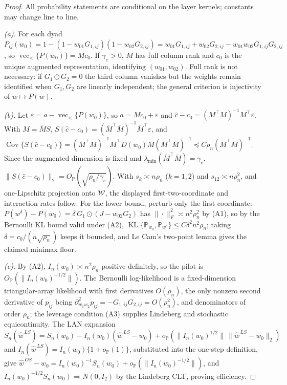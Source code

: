 \documentclass[12pt]{article}
\newcommand{\1}{\mathbf{1}}
\begin{document}
\begin{proof}
All probability statements are conditional on the layer kernels; constants may change line to line.

\emph{(a).} For each dyad $P_{ij}(w_0)=1-(1-w_{01}G_{1,ij})(1-w_{02}G_{2,ij})
=w_{01}G_{1,ij}+w_{02}G_{2,ij}-w_{01}w_{02}G_{1,ij}G_{2,ij}$, so
$\operatorname{vec}_<\{P(w_0)\}=Mc_0$. If $\gamma_e>0$, $M$ has full column rank and $c_0$ is the
unique augmented representation, identifying $(w_{01},w_{02})$. Full rank is not necessary: if
$G_1\odot G_2=0$ the third column vanishes but the weights remain identified when $G_1,G_2$ are
linearly independent; the general criterion is injectivity of $w\mapsto P(w)$.

\emph{(b).} Let $\varepsilon=a-\operatorname{vec}_<\{P(w_0)\}$, so $a=Mc_0+\varepsilon$ and
$\widehat c-c_0=(M^\top M)^{-1}M^\top\varepsilon$. With $M=\bar MS$,
$S(\widehat c-c_0)=(\bar M^\top\bar M)^{-1}\bar M^\top\varepsilon$, and
$\operatorname{Cov}\{S(\widehat c-c_0)\}=(\bar M^\top\bar M)^{-1}\bar M^\top D(w_0)\bar M(\bar M^\top\bar
M)^{-1}\preceq C\rho_n(\bar M^\top\bar M)^{-1}$. Since the augmented dimension is fixed and
$\lambda_{\min}(\bar M^\top\bar M)=\gamma_e$, $\|S(\widehat c-c_0)\|_2=O_{\mathbb P}(\sqrt{\rho_n/
\gamma_e})$. With $s_k\asymp n\rho_n$ ($k=1,2$) and $s_{12}\asymp n\rho_n^2$, and one-Lipschitz
projection onto $\mathcal W$, the displayed first-two-coordinate and interaction rates follow. For the
lower bound, perturb only the first coordinate: $P(w^\delta)-P(w_0)=\delta\,G_1\odot(J-w_{02}G_2)$ has
$\|\cdot\|_F^2\asymp n^2\rho_n^2$ by (A1), so by the Bernoulli KL bound valid under (A2),
$\operatorname{KL}\{\mathbb P_{w_0},\mathbb P_{w^\delta}\}\le C\delta^2n^2\rho_n$; taking
$\delta=c_0/(n\sqrt{\rho_n})$ keeps it bounded, and Le Cam's two-point lemma gives the claimed minimax
floor.

\emph{(c).} By (A2), $I_n(w_0)\asymp n^2\rho_n$ positive-definitely, so the pilot is
$O_{\mathbb P}(\|I_n(w_0)^{-1/2}\|)$. The Bernoulli log-likelihood is a fixed-dimension triangular-array
likelihood with first derivatives $O(\rho_n)$, the only nonzero second derivative of $p_{ij}$ being
$\partial^2_{w_1w_2}p_{ij}=-G_{1,ij}G_{2,ij}=O(\rho_n^2)$, and denominators of order $\rho_n$; the
leverage condition (A3) supplies Lindeberg and stochastic equicontinuity. The LAN expansion
$S_n(\widehat w^{\,LS})=S_n(w_0)-I_n(w_0)(\widehat w^{\,LS}-w_0)+o_{\mathbb P}(\|I_n(w_0)^{1/2}\|\,
\|\widehat w^{\,LS}-w_0\|_2)$ and $I_n(\widehat w^{\,LS})=I_n(w_0)\{1+o_{\mathbb P}(1)\}$, substituted
into the one-step definition, give
$\widehat w^{\,OS}-w_0=I_n(w_0)^{-1}S_n(w_0)+o_{\mathbb P}(\|I_n(w_0)^{-1/2}\|)$, and
$I_n(w_0)^{-1/2}S_n(w_0)\Rightarrow N(0,I_2)$ by the Lindeberg CLT, proving efficiency.


\end{proof}
\end{document}
